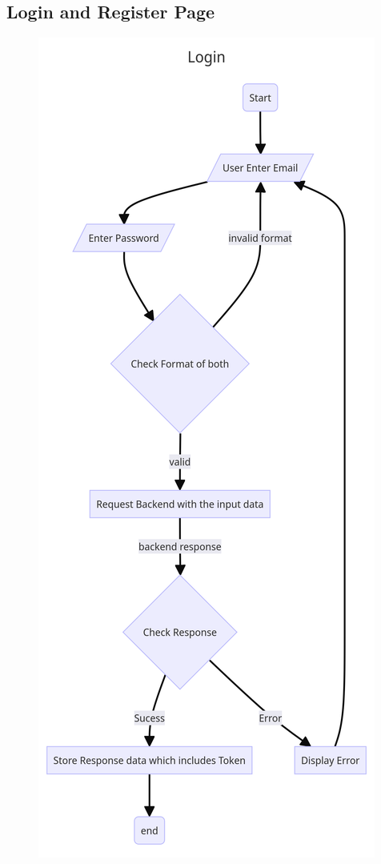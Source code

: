 \subsection{Login and Register Page}
\begin{figure}[H]
    \begin{minipage}{0.48\textwidth}
        \centering
        \includegraphics[width=\textwidth,height=\textheight,keepaspectratio]{Assets/loginPageFlow.png}

\end{minipage}
\end{figure}
